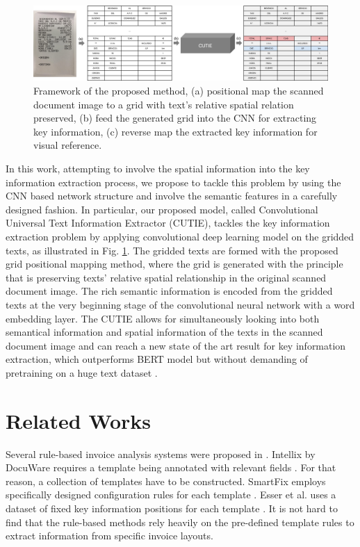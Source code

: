 \documentclass[10pt,twocolumn,letterpaper]{article}
\begin{document}
\begin{figure}
\begin{center}
\includegraphics[width=0.99\linewidth]{Model.jpg}
\end{center}
   \caption{Framework of the proposed method, (a) positional map the scanned document image to a grid with text's relative spatial relation preserved, (b) feed the generated grid into the CNN for extracting key information, (c) reverse map the extracted key information for visual reference.}
\label{fig:cutie}
\end{figure}
In this work, attempting to involve the spatial information into the key information extraction process, we propose to tackle this problem by using the CNN based network structure and involve the semantic features in a carefully designed fashion. In particular, our proposed model, called Convolutional Universal Text Information Extractor (CUTIE), tackles the key information extraction problem by applying convolutional deep learning model on the gridded texts, as illustrated in Fig. \ref{fig:cutie}. The gridded texts are formed with the proposed grid positional mapping method, where the grid is generated with the principle that is preserving texts’ relative spatial relationship in the original scanned document image. The rich semantic information is encoded from the gridded texts at the very beginning stage of the convolutional neural network with a word embedding layer. The CUTIE allows for simultaneously looking into both semantical information and spatial information of the texts in the scanned document image and can reach a new state of the art result for key information extraction, which outperforms BERT model but without demanding of pretraining on a huge text dataset \cite{bert,transformer}.


\section{Related Works}
Several rule-based invoice analysis systems were proposed in \cite{3,5,7}. Intellix by DocuWare requires a template being annotated with relevant fields \cite{3}. For that reason, a collection of templates have to be constructed. SmartFix employs specifically designed configuration rules for each template \cite{5}. Esser et al. uses a dataset of fixed key information positions for each template \cite{7}. It is not hard to find that the rule-based methods rely heavily on the pre-defined template rules to extract information from specific invoice layouts.
\end{document}

